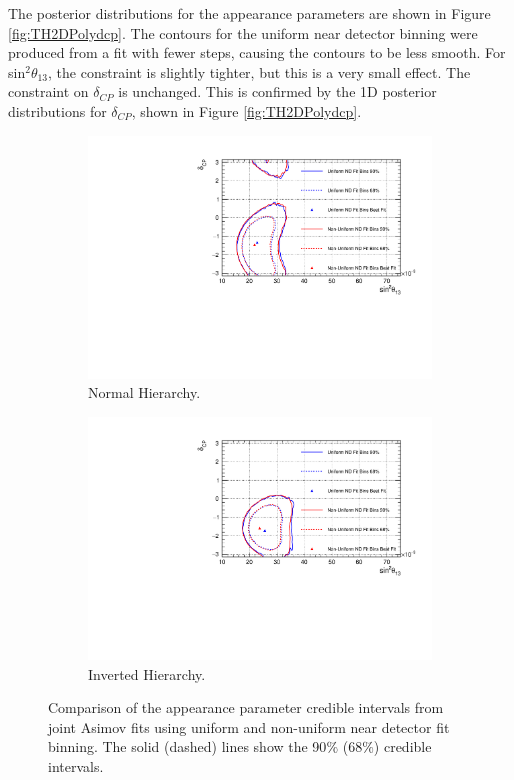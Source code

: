 The posterior distributions for the appearance parameters are shown in Figure \ref{fig:TH2DPolydcp}. The contours for the uniform near detector binning were produced from a fit with fewer steps, causing the contours to be less smooth. For sin$^2\theta_{13}$, the constraint is slightly tighter, but this is a very small effect. The constraint on $\delta_{CP}$ is unchanged. This is confirmed by the 1D posterior distributions for $\delta_{CP}$, shown in Figure \ref{fig:TH2DPolydcp}.

\begin{figure}[!htbp]
\centering
\begin{subfigure}{.7\textwidth}
  \centering
  \includegraphics[width=0.95\linewidth]{figs/compMaCh3Contours_TH2DvsTHPoly_asimov/compMaCh3Contours_TH2DvsTHPoly_app_asimovA_NH}
  \caption{Normal Hierarchy.}
  \label{fig:TH2DPolyAppNH}
\end{subfigure}
\begin{subfigure}{.7\textwidth}
  \centering
  \includegraphics[width=0.95\linewidth]{figs/compMaCh3Contours_TH2DvsTHPoly_asimov/compMaCh3Contours_TH2DvsTHPoly_app_asimovA_IH}
  \caption{Inverted Hierarchy.}
  \label{fig:TH2DPolyAppIH}
\end{subfigure}
\caption{Comparison of the appearance parameter credible intervals from joint Asimov fits using uniform and non-uniform near detector fit binning. The solid (dashed) lines show the 90$\%$ ($68\%$) credible intervals.}
\label{fig:TH2DPolyApp}
\end{figure}

